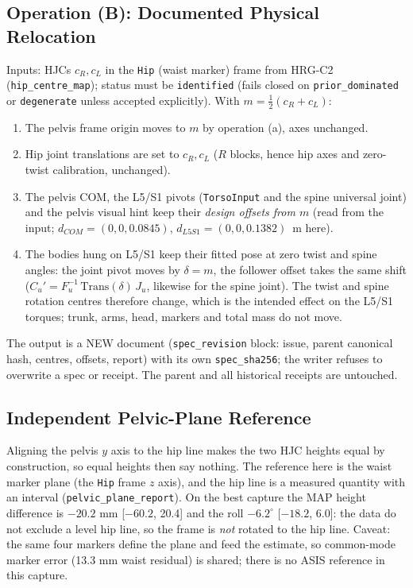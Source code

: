 \subsection{Operation (B): Documented Physical Relocation}
Inputs: HJCs $c_R,c_L$ in the \texttt{Hip} (waist marker) frame from HRG-C2
(\texttt{hip\_centre\_map}); status must be \texttt{identified} (fails closed on
\texttt{prior\_dominated} or \texttt{degenerate} unless accepted explicitly).
With $m=\tfrac12(c_R+c_L)$:
\begin{enumerate}
  \item The pelvis frame origin moves to $m$ by operation (a), axes unchanged.
  \item Hip joint translations are set to $c_R,c_L$ ($R$ blocks, hence hip axes and
  zero-twist calibration, unchanged).
  \item The pelvis COM, the L5/S1 pivots (\texttt{TorsoInput} and the spine universal
  joint) and the pelvis visual hint keep their \emph{design offsets from $m$}
  (read from the input; $d_{COM}=(0,0,0.0845)$, $d_{L5S1}=(0,0,0.1382)$~m here).
  \item The bodies hung on L5/S1 keep their fitted pose at zero twist and spine
  angles: the joint pivot moves by $\delta=m$, the follower offset takes the same shift
  ($C_u'=F_u^{-1}\,\mathrm{Trans}(\delta)\,J_u$, likewise for the spine joint). The
  twist and spine rotation centres therefore change, which is the intended effect on
  the L5/S1 torques; trunk, arms, head, markers and total mass do not move.
\end{enumerate}
The output is a NEW document (\texttt{spec\_revision} block: issue, parent canonical
hash, centres, offsets, report) with its own \texttt{spec\_sha256}; the writer refuses
to overwrite a spec or receipt. The parent and all historical receipts are untouched.

\subsection{Independent Pelvic-Plane Reference}
Aligning the pelvis $y$ axis to the hip line makes the two HJC heights equal by
construction, so equal heights then say nothing. The reference here is the waist
marker plane (the \texttt{Hip} frame $z$ axis), and the hip line is a measured quantity
with an interval (\texttt{pelvic\_plane\_report}). On the best capture the MAP height
difference is $-20.2$ mm [$-60.2$, 20.4] and the roll $-6.2^\circ$ [$-18.2$, 6.0]: the
data do not exclude a level hip line, so the frame is \emph{not} rotated to the hip
line. Caveat: the same four markers define the plane and feed the estimate, so common-mode
marker error (13.3 mm waist residual) is shared; there is no ASIS reference in this
capture.

